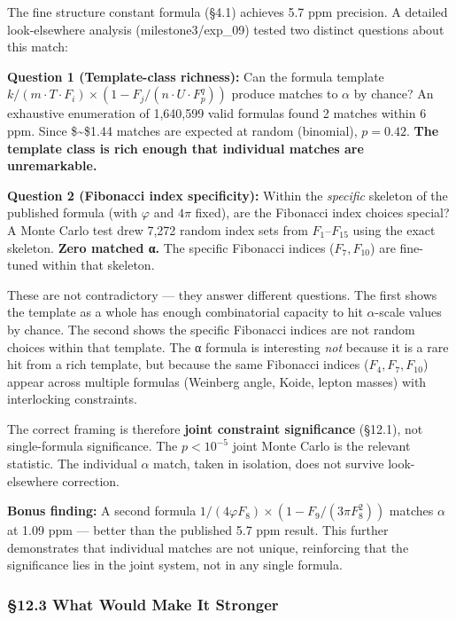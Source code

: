 \documentclass[
  11pt,
  a4paper]{article}
\begin{document}
The fine structure constant formula (§4.1) achieves 5.7 ppm precision. A
detailed look-elsewhere analysis (milestone3/exp\_09) tested two
distinct questions about this match:

\textbf{Question 1 (Template-class richness):} Can the formula template
\(k/(m \cdot T \cdot F_i) \times (1 - F_j/(n \cdot U \cdot F_p^q))\)
produce matches to \(\alpha\) by chance? An exhaustive enumeration of
1,640,599 valid formulas found 2 matches within 6 ppm. Since
\$\sim\$1.44 matches are expected at random (binomial), \(p = 0.42\).
\textbf{The template class is rich enough that individual matches are
unremarkable.}

\textbf{Question 2 (Fibonacci index specificity):} Within the
\emph{specific} skeleton of the published formula (with \(\varphi\) and
\(4\pi\) fixed), are the Fibonacci index choices special? A Monte Carlo
test drew 7,272 random index sets from \(F_1\)--\(F_{15}\) using the
exact skeleton. \textbf{Zero matched α.} The specific Fibonacci indices
(\(F_7, F_{10}\)) are fine-tuned within that skeleton.

These are not contradictory --- they answer different questions. The
first shows the template as a whole has enough combinatorial capacity to
hit \(\alpha\)-scale values by chance. The second shows the specific
Fibonacci indices are not random choices within that template. The α
formula is interesting \emph{not} because it is a rare hit from a rich
template, but because the same Fibonacci indices (\(F_4, F_7, F_{10}\))
appear across multiple formulas (Weinberg angle, Koide, lepton masses)
with interlocking constraints.

The correct framing is therefore \textbf{joint constraint significance}
(§12.1), not single-formula significance. The \(p < 10^{-5}\) joint
Monte Carlo is the relevant statistic. The individual \(\alpha\) match,
taken in isolation, does not survive look-elsewhere correction.

\textbf{Bonus finding:} A second formula
\(1/(4\varphi F_8) \times (1 - F_9/(3\pi F_8^2))\) matches \(\alpha\) at
1.09 ppm --- better than the published 5.7 ppm result. This further
demonstrates that individual matches are not unique, reinforcing that
the significance lies in the joint system, not in any single formula.

\subsubsection{§12.3 What Would Make It
Stronger}\label{what-would-make-it-stronger}
\end{document}
